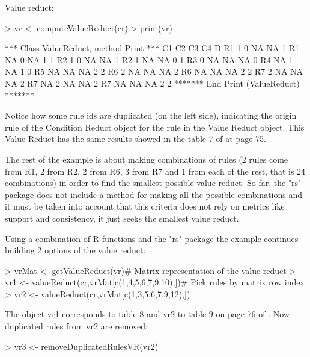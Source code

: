\documentclass[a4paper]{article}
\begin{document}
Value reduct:
\begin{Schunk}
\begin{Sinput}
> vr <- computeValueReduct(cr)
> print(vr)
\end{Sinput}
\begin{Soutput}
*** Class ValueReduct, method Print *** 
   C1 C2 C3 C4 D
R1 1  0  NA NA 1
R1 NA 0  NA 1  1
R2 1  0  NA NA 1
R2 1  NA NA 0  1
R3 0  NA NA NA 0
R4 NA 1  NA 1  0
R5 NA NA NA 2  2
R6 2  NA NA NA 2
R6 NA NA NA 2  2
R7 2  NA NA NA 2
R7 NA 2  NA NA 2
R7 NA NA NA 2  2
******* End Print (ValueReduct) ******* 
\end{Soutput}
\end{Schunk}

Notice how some rule ids are duplicated (on the left side), indicating the origin rule of the Condition Reduct object for the rule in the Value Reduct object. This Value Reduct has the same results showed in the table 7 of \cite{pawlak} at page 75.

The rest of the example is about making combinations of rules (2 rules come from R1, 2 from R2, 2 from R6, 3 from R7 and 1 from each of the rest, that is 24 combinations) in order to find the smallest possible value reduct. So far, the "rs" package does not include a method for making all the possible combinations and it must be taken into account that this criteria does not rely on metrics like support and consistency, it just seeks the smallest value reduct. 

Using a combination of R functions and the "rs" package the example continues building 2 options of the value reduct:

\begin{Schunk}
\begin{Sinput}
> vrMat <- getValueReduct(vr)# Matrix representation of the value reduct
> vr1 <- valueReduct(cr,vrMat[c(1,4,5,6,7,9,10),])# Pick rules by matrix row index
> vr2 <- valueReduct(cr,vrMat[c(1,3,5,6,7,9,12),])
\end{Sinput}
\end{Schunk}

The object vr1 corresponds to table 8 and vr2 to table 9 on page 76 of  \cite{pawlak}. Now duplicated rules from vr2 are removed:

\begin{Schunk}
\begin{Sinput}
> vr3 <- removeDuplicatedRulesVR(vr2)
\end{Sinput}
\end{Schunk}
\end{document}
